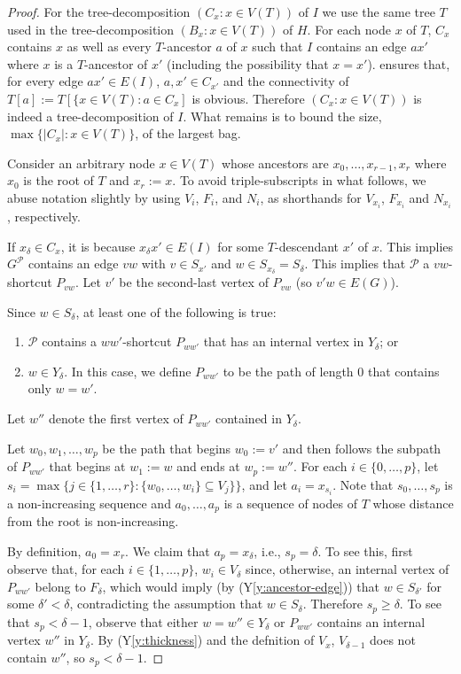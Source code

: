 \documentclass{patmorin}
\newcommand{\yref}[1]{(Y\ref{y:#1})}
\begin{document}
\begin{proof}
  For the tree-decomposition $(C_x:x\in V(T))$ of $I$ we use the same tree $T$ used in the tree-decomposition $(B_x:x\in V(T))$ of $H$. For each node $x$ of $T$, $C_x$ contains $x$ as well as every $T$-ancestor $a$ of $x$ such that $I$ contains an edge $ax'$ where $x$ is a $T$-ancestor of $x'$ (including the possibility that $x=x'$).
   ensures that, for every edge $ax'\in E(I)$, $a,x'\in C_{x'}$ and the connectivity of $T[a]:=T[\{x\in V(T):a\in C_x]$ is obvious.  Therefore $(C_x:x\in V(T))$ is indeed a tree-decomposition of $I$.  What remains is to bound the size, $\max\{|C_x|:x\in V(T)\}$, of the largest bag.
  
  Consider an arbitrary node $x\in V(T)$ whose ancestors are $x_0,\ldots,x_{r-1},x_r$ where $x_0$ is the root of $T$ and $x_r:=x$.  To avoid triple-subscripts in what follows, we abuse notation slightly by using $V_i$, $F_i$, and $N_i$,  as shorthands for $V_{x_i}$, $F_{x_i}$ and $N_{x_i}$, respectively.   

  If $x_\delta\in C_x$, it is because $x_\delta x'\in E(I)$ for some $T$-descendant $x'$ of $x$.  This implies $G^{\mathcal{P}}$ contains an edge $vw$ with $v\in S_{x'}$ and $w\in S_{x_\delta}=S_\delta$.  This implies that $\mathcal{P}$ a $vw$-shortcut $P_{vw}$.  Let $v'$ be the second-last vertex of $P_{vw}$ (so $v'w\in E(G)$).  
  
  Since $w\in S_{\delta}$, at least one of the following is true:
  \begin{enumerate}
    \item $\mathcal{P}$ contains a $ww'$-shortcut $P_{ww'}$ that has an internal vertex in $Y_{\delta}$; or
    \item $w\in Y_\delta$.  In this case, we define $P_{ww'}$ to be the path of length 0 that contains only $w=w'$. 
  \end{enumerate}
  Let $w''$ denote the first vertex of $P_{ww'}$ contained in $Y_{\delta}$.
  
  Let $w_0,w_1,\ldots,w_p$ be the path that begins $w_0:=v'$ and then follows the subpath of $P_{ww'}$ that begins at $w_1:=w$ and ends at $w_p:=w''$.  For each $i\in\{0,\ldots,p\}$, let $s_i=\max\{j\in\{1,\ldots,r\}: \{w_0,\ldots,w_i\}\subseteq V_{j}\}\}$, and let $a_i=x_{s_i}$.  Note that $s_0,\ldots,s_p$ is a non-increasing sequence and $a_0,\ldots,a_p$ is a sequence of nodes of $T$ whose distance from the root is non-increasing.

  By definition, $a_0=x_r$.  We claim that $a_p=x_\delta$, i.e., $s_p=\delta$. 
  To see this, first observe that, for each $i\in\{1,\ldots,p\}$, $w_i\in V_{\delta}$ since, otherwise, an internal vertex of $P_{ww'}$ belong to $F_\delta$, which would imply (by \yref{ancestor-edge}) that $w\in S_{\delta'}$ for some $\delta' < \delta$, contradicting the assumption that $w\in S_\delta$.  Therefore $s_p\ge\delta$.  To see that $s_p<\delta-1$,
  observe that either $w=w''\in Y_\delta$ or $P_{ww'}$ contains an internal vertex $w''$ in $Y_\delta$.  By \yref{thickness} and the defnition of $V_x$, $V_{\delta-1}$ does not contain $w''$, so $s_p<\delta-1$.
  

\end{proof}
\end{document}
